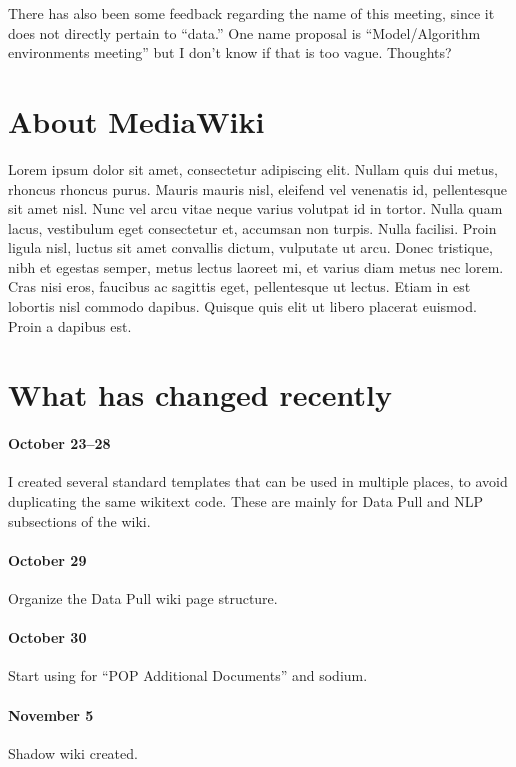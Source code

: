 \documentclass{tufte-handout}
\begin{document}
There has also been some feedback regarding the name of this meeting,
since it does not directly pertain to ``data.'' One name proposal is
``Model/Algorithm environments meeting'' but I don't know if that is
too vague. Thoughts?

\section{About MediaWiki}

Lorem ipsum dolor sit amet, consectetur adipiscing elit. Nullam quis
dui metus, rhoncus rhoncus purus. Mauris mauris nisl, eleifend vel
venenatis id, pellentesque sit amet nisl. Nunc vel arcu vitae neque
varius volutpat id in tortor. Nulla quam lacus, vestibulum eget
consectetur et, accumsan non turpis. Nulla facilisi. Proin ligula
nisl, luctus sit amet convallis dictum, vulputate ut arcu. Donec
tristique, nibh et egestas semper, metus lectus laoreet mi, et varius
diam metus nec lorem. Cras nisi eros, faucibus ac sagittis eget,
pellentesque ut lectus. Etiam in est lobortis nisl commodo dapibus.
Quisque quis elit ut libero placerat euismod. Proin a dapibus est.

\section{What has changed recently}

\paragraph{October 23--28} I created several standard templates that
can be used in multiple places, to avoid duplicating the same wikitext
code. These are mainly for Data Pull and NLP subsections of the wiki. 

\paragraph{October 29} Organize the Data Pull wiki page structure. 

\paragraph{October 30} Start using for ``POP Additional Documents''
and sodium.

\paragraph{November 5} Shadow wiki created.
\end{document}
